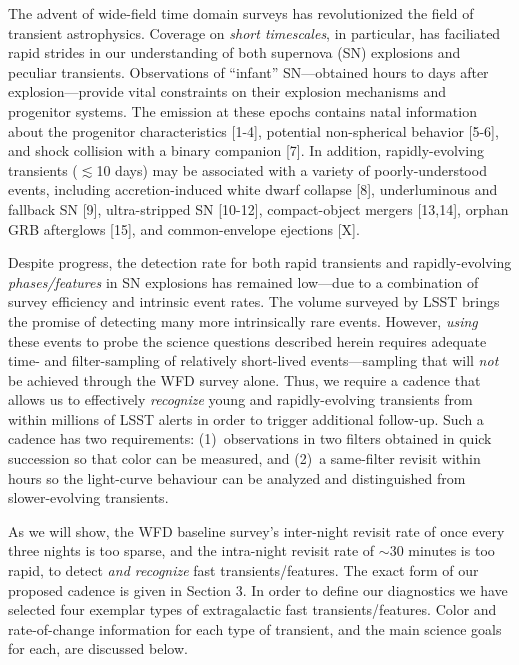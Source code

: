 \documentclass[12pt, letterpaper]{article}
\begin{document}
The advent of wide-field time domain surveys has revolutionized the field of transient astrophysics. Coverage on \emph{short timescales}, in particular, has faciliated rapid strides in our understanding of both supernova (SN) explosions and peculiar transients. Observations of ``infant'' SN---obtained hours to days after explosion---provide vital constraints on their explosion mechanisms and progenitor systems. The emission at these epochs contains natal information about the progenitor characteristics [1-4], potential non-spherical behavior [5-6], and shock collision with a binary companion [7]. In addition, rapidly-evolving transients ($\lesssim$10 days) may be associated with a variety of poorly-understood events, including accretion-induced white dwarf collapse [8], underluminous and fallback SN [9], ultra-stripped SN [10-12], compact-object mergers [13,14], orphan GRB afterglows [15], and common-envelope ejections [X].


Despite progress, the detection rate for both rapid transients and rapidly-evolving \emph{phases/features} in SN explosions has remained low---due to a combination of survey efficiency and intrinsic event rates. The volume surveyed by LSST brings the promise of detecting many more intrinsically rare events. However, \emph{using} these events to probe the science questions described herein requires adequate time- and filter-sampling of relatively short-lived events---sampling that will \emph{not} be achieved through the WFD survey alone. Thus, we require a cadence that allows us to effectively \emph{recognize} young and rapidly-evolving transients from within millions of LSST alerts in order to trigger additional follow-up. Such a cadence has two requirements: (1)~observations in two filters obtained in quick succession so that color can be measured, and (2)~a same-filter revisit within hours so the light-curve behaviour can be analyzed and distinguished from slower-evolving transients. 


As we will show, the WFD baseline survey's inter-night revisit rate of once every three nights is too sparse, and the intra-night revisit rate of $\sim$30 minutes is too rapid, to detect \emph{and recognize} fast transients/features. The exact form of our proposed cadence is given in Section 3. In order to define our diagnostics we have selected four exemplar types of extragalactic fast transients/features. Color and rate-of-change information for each type of transient, and the main science goals for each, are discussed below.
\end{document}
